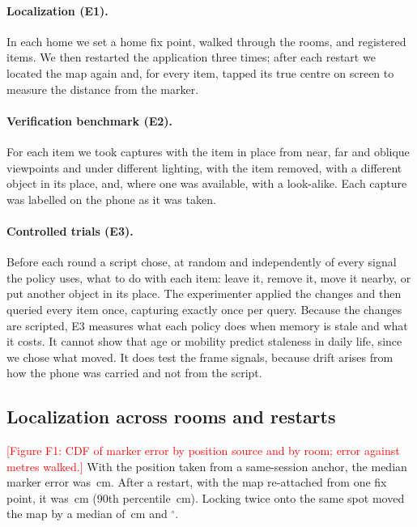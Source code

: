 \documentclass[sigconf,10pt]{acmart}
\newcommand{\todo}[1]{\textcolor{red}{[#1]}}
\begin{document}
\paragraph{Localization (E1).}
In each home we set a home fix point, walked through the rooms, and registered \NItemsPerSite{}
items.
We then restarted the application three times; after each restart we located the map again and,
for every item, tapped its true centre on screen to measure the distance from the marker.

\paragraph{Verification benchmark (E2).}
For each item we took captures with the item in place from near, far and oblique viewpoints and
under different lighting, with the item removed, with a different object in its place, and, where
one was available, with a look-alike.
Each capture was labelled on the phone as it was taken.

\paragraph{Controlled trials (E3).}
Before each round a script chose, at random and independently of every signal the policy uses,
what to do with each item: leave it, remove it, move it nearby, or put another object in its
place.
The experimenter applied the changes and then queried every item once, capturing exactly once per
query.
Because the changes are scripted, E3 measures what each policy does when memory is stale and what
it costs.
It cannot show that age or mobility predict staleness in daily life, since we chose what moved.
It does test the frame signals, because drift arises from how the phone was carried and not from
the script.

\subsection{Localization across rooms and restarts}

\todo{Figure F1: CDF of marker error by position source and by room; error against metres walked.}
With the position taken from a same-session anchor, the median marker error was
\MarkerErrSessionMedianCm{}\,cm.
After a restart, with the map re-attached from one fix point, it was \MarkerErrMapMedianCm{}\,cm
(90th percentile \MarkerErrMapPninetyCm{}\,cm).
Locking twice onto the same spot moved the map by a median of \RelockJumpMedianCm{}\,cm and
\RelockJumpMedianDeg{}$^\circ$.
\end{document}
